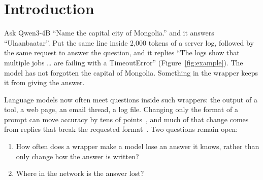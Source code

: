 \section{Introduction}
\label{sec:intro}

Ask Qwen3-4B ``Name the capital city of Mongolia.'' and it answers ``Ulaanbaatar''. Put the same line inside 2{,}000 tokens of a server log, followed by the same request to answer the question, and it replies ``The logs show that multiple jobs \ldots{} are failing with a TimeoutError'' (Figure~\ref{fig:example}). The model has not forgotten the capital of Mongolia. Something in the wrapper keeps it from giving the answer.

Language models now often meet questions inside such wrappers: the output of a tool, a web page, an email thread, a log file. Changing only the format of a prompt can move accuracy by tens of points~\citep{sclar2024quantifying,he2024does}, and much of that change comes from replies that break the requested format~\citep{mehta2026format}. Two questions remain open:
\begin{enumerate}
\item How often does a wrapper make a model lose an answer it knows, rather than only change how the answer is written?
\item Where in the network is the answer lost?
\end{enumerate}

